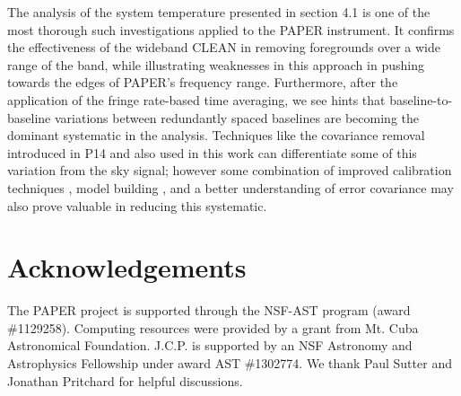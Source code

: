\documentclass{aastex}
\begin{document}
The analysis of the system temperature presented in section 4.1 is one of the most thorough such investigations applied to the PAPER instrument.  It confirms the effectiveness of the wideband CLEAN in removing foregrounds over a wide range of the band, while illustrating weaknesses in this approach in pushing towards the edges of PAPER's frequency range.  Furthermore, after the application of the fringe rate-based time averaging, we see hints that baseline-to-baseline variations between redundantly spaced baselines are becoming the dominant systematic in the analysis.  Techniques like the covariance removal introduced in P14 and also used in this work can differentiate some of this variation from the sky signal; however some combination of improved calibration techniques \citep{Zheng:2014p10467}, model building \citep{Sullivan:2012p9457}, and a better understanding of error covariance  \citep{Liu:2011p8763} may also prove valuable in reducing this systematic.



\section{Acknowledgements}
The PAPER project is supported through the NSF-AST program (award \#1129258). Computing resources were provided by a grant from Mt. Cuba Astronomical Foundation.  J.C.P. is supported by an NSF Astronomy and Astrophysics Fellowship under award AST \#1302774.   We thank Paul Sutter and Jonathan Pritchard for helpful discussions.




\end{document}
